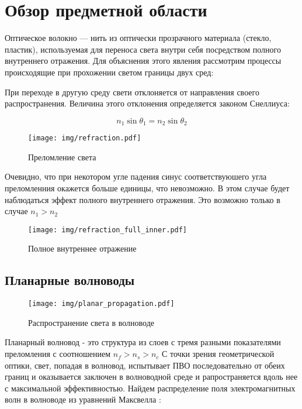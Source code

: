 \chapter{Обзор предметной области}
Оптическое волокно — нить из оптически прозрачного материала (стекло, пластик), используемая для переноса света внутри себя посредством полного внутреннего отражения. Для объяснения этого явления рассмотрим процессы происходящие при прохожении светом границы двух сред:

При переходе в другую среду свети отклоняется от направления своего распространения. Величина этого отклонения определяется законом Снеллиуса:

\begin{equation}
 n_1 \sin\theta_1 = n_2 \sin\theta_2
\end{equation}

\begin{figure}[h!]
\texttt{[image: img/refraction.pdf]}
\caption{Преломление света}
\end{figure}

Очевидно, что при некотором угле падения синус соответствуюшего угла преломленния окажется больше единицы, что невозможно. В этом случае будет наблюдаться эффект полного внутреннего отражения. Это возможно только в случае $n_1 > n_2$

\begin{figure}[h!]
\texttt{[image: img/refraction\_full\_inner.pdf]}
\caption{Полное внутреннее отражение}
\end{figure}

\section{Планарные волноводы}

\begin{figure}[h!]
\texttt{[image: img/planar\_propagation.pdf]}
\caption{Распространение света в волноводе}
\end{figure}

Планарный волновод - это структура из слоев с тремя разными показателями преломления с соотношением $n_f > n_s > n_c$ С точки зрения геометрической оптики, свет, попадая в волновод, испытывает ПВО последовательно от обеих границ и оказывается заключен в волноводной среде и рапространяется вдоль нее с максимальной эффективностью. Найдем распределение поля электромагнитных волн в волноводе из уравнений Максвелла \cite{adams}:

